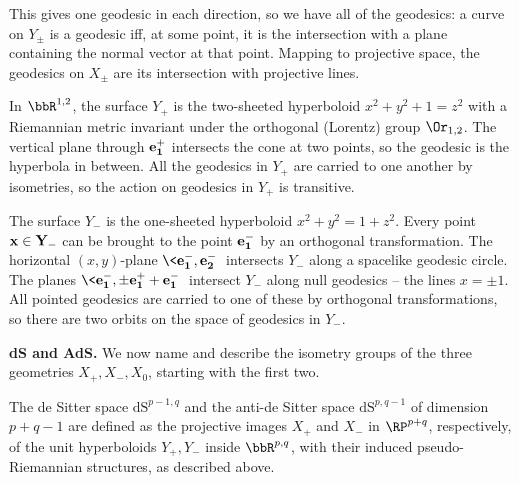 This gives one geodesic in each direction, so we have all of the geodesics: a curve on $Y_\pm$ is a geodesic iff, at some point, it is the intersection with a plane containing the normal vector at that point. Mapping to projective space, the geodesics on $X_\pm$ are its intersection with projective lines.

\begin{example}
    In $\bbR^{1,2}$, the surface $Y_+$ is the two-sheeted hyperboloid $x^2+y^2+1=z^2$ with a Riemannian metric invariant under the orthogonal (Lorentz) group $\Or_{1,2}$. The vertical plane through $\bf{e}_1^+$ intersects the cone at two points, so the geodesic is the hyperbola in between. All the geodesics in $Y_+$ are carried to one another by isometries, so the action on geodesics in $Y_+$ is transitive.

    The surface $Y_-$ is the one-sheeted hyperboloid $x^2+y^2=1+z^2$. Every point $\bf{x}\in Y_-$ can be brought to the point $\bf{e}_1^-$ by an orthogonal transformation. The horizontal $(x,y)$-plane $\<\bf{e}_1^-,\bf{e}_2^-\>$ intersects $Y_-$ along a spacelike geodesic circle. The planes $\<\bf{e}_1^-,\pm \bf{e}_1^++\bf{e}_1^-\>$ intersect $Y_-$ along null geodesics -- the lines $x=\pm 1$. All pointed geodesics are carried to one of these by orthogonal transformations, so there are two orbits on the space of geodesics in $Y_-$.
\end{example}

\textbf{dS and AdS.} We now name and describe the isometry groups of the three geometries $X_+,X_-,X_0$, starting with the first two.

\begin{defn}
    The de Sitter space $\mathrm{dS}^{p-1,q}$ and the anti-de Sitter space $\mathrm{dS}^{p,q-1}$ of dimension $p+q-1$ are defined as the projective images $X_+$ and $X_-$ in $\RP^{p+q}$, respectively, of the unit hyperboloids $Y_+,Y_-$ inside $\bbR^{p,q}$, with their induced pseudo-Riemannian structures, as described above.
\end{defn}

